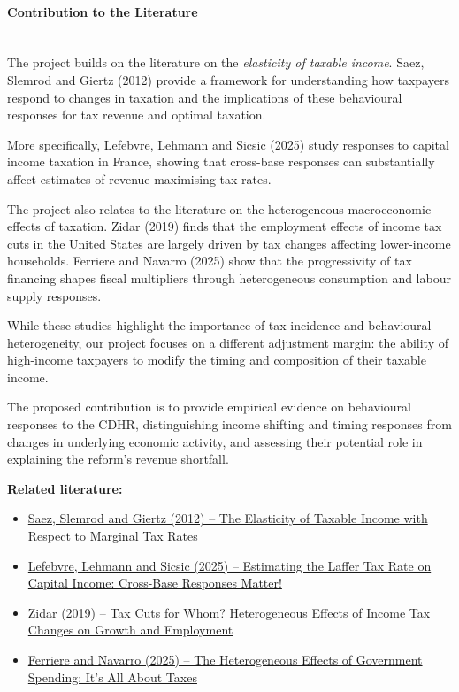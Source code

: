 \documentclass{article}
\begin{document}
\paragraph{Contribution to the Literature} \\

The project builds on the literature on the \textit{elasticity of taxable income}. Saez, Slemrod and Giertz (2012) provide a framework for understanding how taxpayers respond to changes in taxation and the implications of these behavioural responses for tax revenue and optimal taxation.

More specifically, Lefebvre, Lehmann and Sicsic (2025) study responses to capital income taxation in France, showing that cross-base responses can substantially affect estimates of revenue-maximising tax rates.

The project also relates to the literature on the heterogeneous macroeconomic effects of taxation. Zidar (2019) finds that the employment effects of income tax cuts in the United States are largely driven by tax changes affecting lower-income households. Ferriere and Navarro (2025) show that the progressivity of tax financing shapes fiscal multipliers through heterogeneous consumption and labour supply responses.

While these studies highlight the importance of tax incidence and behavioural heterogeneity, our project focuses on a different adjustment margin: the ability of high-income taxpayers to modify the timing and composition of their taxable income.

The proposed contribution is to provide empirical evidence on behavioural responses to the CDHR, distinguishing income shifting and timing responses from changes in underlying economic activity, and assessing their potential role in explaining the reform's revenue shortfall.

\medskip

\noindent \textbf{Related literature:}
\begin{itemize}
    \item \href{https://doi.org/10.1257/jel.50.1.3}
    {Saez, Slemrod and Giertz (2012) -- The Elasticity of Taxable Income with Respect to Marginal Tax Rates}

    \item \href{https://doi.org/10.1111/sjoe.12578}
    {Lefebvre, Lehmann and Sicsic (2025) -- Estimating the Laffer Tax Rate on Capital Income: Cross-Base Responses Matter!}

    \item \href{https://doi.org/10.1086/701424}
    {Zidar (2019) -- Tax Cuts for Whom? Heterogeneous Effects of Income Tax Changes on Growth and Employment}

    \item \href{https://doi.org/10.1093/restud/rdae025}
    {Ferriere and Navarro (2025) -- The Heterogeneous Effects of Government Spending: It's All About Taxes}
\end{itemize}
\end{document}
